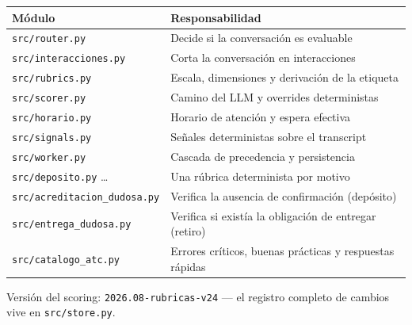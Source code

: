 \documentclass[11pt,a4paper]{article}
\newcommand{\cod}[1]{\texttt{\small #1}}
\begin{document}
\begin{center}
\begin{tabularx}{\textwidth}{@{}lX@{}}
\toprule
\textbf{Módulo} & \textbf{Responsabilidad} \\
\midrule
\cod{src/router.py}        & Decide si la conversación es evaluable \\
\cod{src/interacciones.py} & Corta la conversación en interacciones \\
\cod{src/rubrics.py}       & Escala, dimensiones y derivación de la etiqueta \\
\cod{src/scorer.py}        & Camino del LLM y overrides deterministas \\
\cod{src/horario.py}       & Horario de atención y espera efectiva \\
\cod{src/signals.py}       & Señales deterministas sobre el transcript \\
\cod{src/worker.py}        & Cascada de precedencia y persistencia \\
\cod{src/deposito.py} \dots & Una rúbrica determinista por motivo \\
\cod{src/acreditacion\_dudosa.py} & Verifica la ausencia de confirmación (depósito) \\
\cod{src/entrega\_dudosa.py} & Verifica si existía la obligación de entregar (retiro) \\
\cod{src/catalogo\_atc.py} & Errores críticos, buenas prácticas y respuestas rápidas \\
\bottomrule
\end{tabularx}
\end{center}

\vfill
\begin{center}
\small\color{gray70}
Versión del scoring: \cod{2026.08-rubricas-v24} ---
el registro completo de cambios vive en \cod{src/store.py}.
\end{center}
\end{document}
